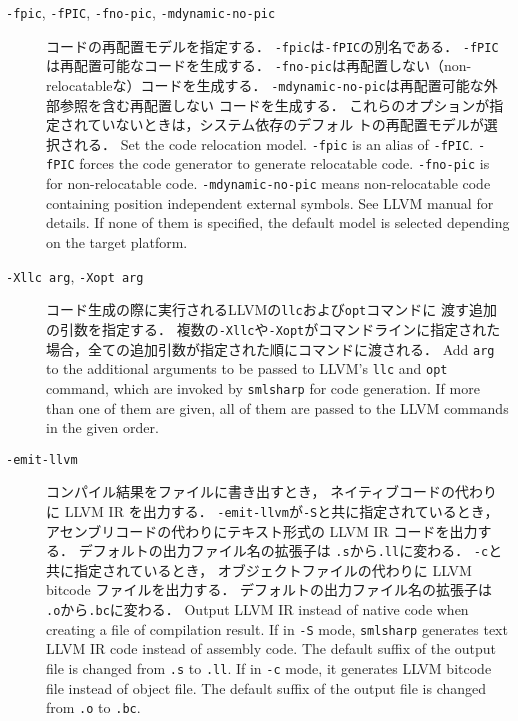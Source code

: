 \documentclass{jbook}
\newcommand{\term}[1]{\mbox{{\tt #1}}}
\begin{document}
\begin{description}
\item[{\tt -fpic},
      {\tt -fPIC},
      {\tt -fno-pic},
      {\tt -mdynamic-no-pic}]
\ifjp%
	コードの再配置モデルを指定する．
	{\tt -fpic}は{\tt -fPIC}の別名である．
	{\tt -fPIC}は再配置可能なコードを生成する．
	{\tt -fno-pic}は再配置しない（non-relocatableな）コードを生成する．
	{\tt -mdynamic-no-pic}は再配置可能な外部参照を含む再配置しない
コードを生成する．
	これらのオプションが指定されていないときは，システム依存のデフォル
トの再配置モデルが選択される．
\else%
	Set the code relocation model.
        {\tt -fpic} is an alias of {\tt -fPIC}.
        {\tt -fPIC} forces the code generator to generate relocatable code.
	{\tt -fno-pic} is for non-relocatable code.
	{\tt -mdynamic-no-pic} means non-relocatable code containing
position independent external symbols.
	See LLVM manual for details.
	If none of them is specified, the default model is selected
depending on the target platform.
\fi%

\item[{\tt -Xllc \term{arg}},
      {\tt -Xopt \term{arg}}]
\ifjp%
	コード生成の際に実行されるLLVMの{\tt llc}および{\tt opt}コマンドに
渡す追加の引数を指定する．
	複数の{\tt -Xllc}や{\tt -Xopt}がコマンドラインに指定された
場合，全ての追加引数が指定された順にコマンドに渡される．
\else%
	Add \term{arg} to the additional arguments to be passed to
LLVM's {\tt llc} and {\tt opt} command, which are invoked by {\tt smlsharp}
for code generation.
	If more than one of them are given,
all of them are passed to the LLVM commands in the given order.
\fi%

\item[{\tt -emit-llvm}]
\ifjp%
	コンパイル結果をファイルに書き出すとき，
ネイティブコードの代わりに LLVM IR を出力する．
	{\tt -emit-llvm}が{\tt -S}と共に指定されているとき，
アセンブリコードの代わりにテキスト形式の LLVM IR コードを出力する．
	デフォルトの出力ファイル名の拡張子は
{\tt .s}から{\tt .ll}に変わる．
	{\tt -c}と共に指定されているとき，
オブジェクトファイルの代わりに LLVM bitcode ファイルを出力する．
	デフォルトの出力ファイル名の拡張子は
{\tt .o}から{\tt .bc}に変わる．
\else%
	Output LLVM IR instead of native code when creating a file of
compilation result.
	If in {\tt -S} mode,
{\tt smlsharp} generates text LLVM IR code instead of assembly code.
	The default suffix of the output file is changed from {\tt .s}
to {\tt .ll}.
	If in {\tt -c} mode,
it generates LLVM bitcode file instead of object file.
	The default suffix of the output file is changed from {\tt .o}
to {\tt .bc}.
\fi%

\end{description}
\end{document}
